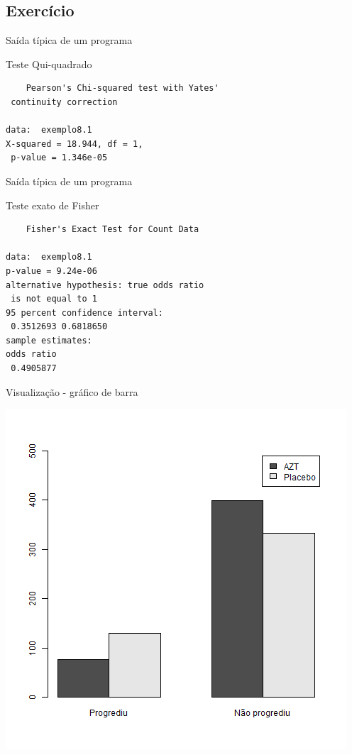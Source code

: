 \documentclass{beamer}
\begin{document}

\subsection{Exercício}

\begin{frame}[fragile]{Saída típica de um programa}
  \begin{block}{Teste Qui-quadrado}
\begin{verbatim}
	Pearson's Chi-squared test with Yates'
 continuity correction

data:  exemplo8.1
X-squared = 18.944, df = 1,
 p-value = 1.346e-05
\end{verbatim}
  \end{block}
\end{frame}

\begin{frame}[fragile]{Saída típica de um programa}
  \begin{block}{Teste exato de Fisher}
\begin{verbatim}
	Fisher's Exact Test for Count Data

data:  exemplo8.1
p-value = 9.24e-06
alternative hypothesis: true odds ratio
 is not equal to 1
95 percent confidence interval:
 0.3512693 0.6818650
sample estimates:
odds ratio
 0.4905877
\end{verbatim}
  \end{block}
\end{frame}

\begin{frame}{Visualização - gráfico de barra}
  \begin{center}
    \includegraphics[height=\textheight]{Cap26-27/barplot}
  \end{center}
\end{frame}
\end{document}
